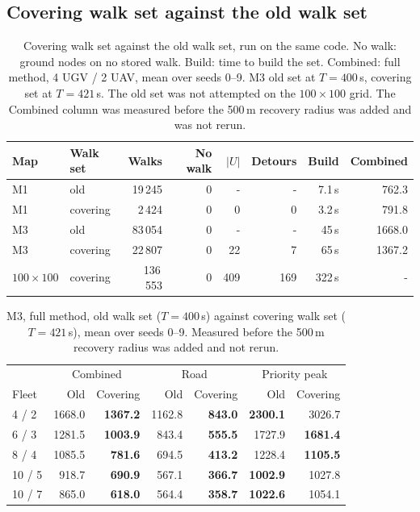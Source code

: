 \documentclass[11pt]{article}
\theoremstyle{definition}
\theoremstyle{plain}
\begin{document}
\subsection{Covering walk set against the old walk set}
\begin{table}[H]
\centering
\small
\caption{Covering walk set against the old walk set, run on the same code.
No walk: ground nodes on no stored walk. Build: time to build the set.
Combined: full method, 4 UGV / 2 UAV, mean over seeds 0--9. M3 old set at
$T = 400$\,s, covering set at $T = 421$\,s. The old set was not attempted on
the $100 \times 100$ grid. The Combined column was measured before the 500\,m
recovery radius was added and was not rerun.}
\label{tab:cover}
\begin{tabular}{llrrrrrr}
\toprule
Map & Walk set & Walks & No walk & $|U|$ & Detours & Build & Combined \\
\midrule
M1 & old & 19\,245 & 0 & - & - & 7.1\,s & 762.3 \\
M1 & covering & 2\,424 & 0 & 0 & 0 & 3.2\,s & 791.8 \\
M3 & old & 83\,054 & 0 & - & - & 45\,s & 1668.0 \\
M3 & covering & 22\,807 & 0 & 22 & 7 & 65\,s & 1367.2 \\
$100 \times 100$ & covering & 136\,553 & 0 & 409 & 169 & 322\,s & - \\
\bottomrule
\end{tabular}
\end{table}

\begin{table}[H]
\centering
\small
\caption{M3, full method, old walk set ($T = 400$\,s) against covering walk
set ($T = 421$\,s), mean over seeds 0--9. Measured before the 500\,m recovery
radius was added and not rerun.}
\label{tab:m3old}
\begin{tabular}{lrrrrrr}
\toprule
& \multicolumn{2}{c}{Combined} & \multicolumn{2}{c}{Road} & \multicolumn{2}{c}{Priority peak} \\
Fleet & Old & Covering & Old & Covering & Old & Covering \\
\midrule
4 / 2 & 1668.0 & \textbf{1367.2} & 1162.8 & \textbf{843.0} & \textbf{2300.1} & 3026.7 \\
6 / 3 & 1281.5 & \textbf{1003.9} & 843.4 & \textbf{555.5} & 1727.9 & \textbf{1681.4} \\
8 / 4 & 1085.5 & \textbf{781.6} & 694.5 & \textbf{413.2} & 1228.4 & \textbf{1105.5} \\
10 / 5 & 918.7 & \textbf{690.9} & 567.1 & \textbf{366.7} & \textbf{1002.9} & 1027.8 \\
10 / 7 & 865.0 & \textbf{618.0} & 564.4 & \textbf{358.7} & \textbf{1022.6} & 1054.1 \\
\bottomrule
\end{tabular}
\end{table}
\end{document}
